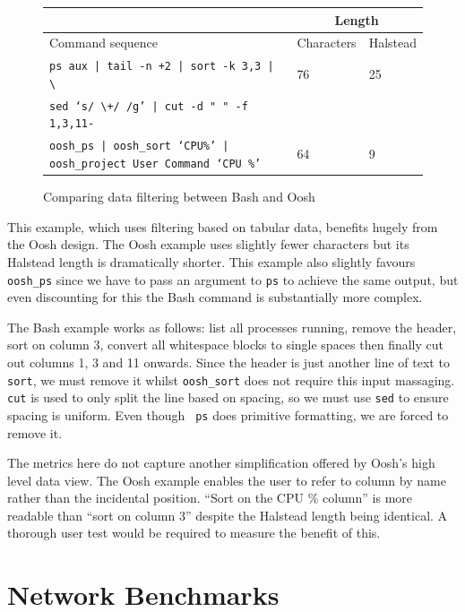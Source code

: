 \documentclass[12pt,twoside,notitlepage]{report}
\begin{document}
\begin{figure}[h]
\begin{tabular}{|l|l|l|}
\cline{2-3}
\multicolumn{1}{l}{} & \multicolumn{2}{|c|}{Length} \\
\hline
Command sequence & Characters & Halstead \\
\hline
{\tt ps aux | tail -n +2 | sort -k 3,3 | \textbackslash} & 76 & 25\\
{\tt sed `s/ \textbackslash+/ /g' | cut -d " " -f 1,3,11-} & & \\
\hline
{\tt oosh\_ps | oosh\_sort `CPU\%' | oosh\_project User Command `CPU \%'} & 64 &
9 \\
\hline
\end{tabular}
\caption{Comparing data filtering between Bash and Oosh}
\end{figure}

This example, which uses filtering based on tabular data, benefits
hugely from the Oosh design. The Oosh example uses slightly fewer
characters but its Halstead length is dramatically shorter. This
example also slightly favours {\tt oosh\_ps} since we have to pass an
argument to {\tt ps} to achieve the same output, but even discounting
for this the Bash command is substantially more complex.

The Bash example works as follows: list all processes running, remove the
header, sort on column 3, convert all whitespace blocks to single spaces then
finally cut out columns 1, 3 and 11 onwards. Since the header is just another
line of text to {\tt sort}, we must remove it whilst {\tt oosh\_sort} does not
require this input massaging. {\tt cut} is used to only split the line based on
spacing, so we must use {\tt sed} to ensure spacing is uniform. Even though {\tt
  ps} does primitive formatting, we are forced to remove it.

The metrics here do not capture another simplification offered by Oosh's high
level data view. The Oosh example enables the user to refer to column by name
rather than the incidental position. ``Sort on the CPU \% column'' is more
readable than ``sort on column 3'' despite the Halstead length being
identical. A thorough user test would be required to measure the benefit of
this.


\section{Network Benchmarks}
\end{document}
